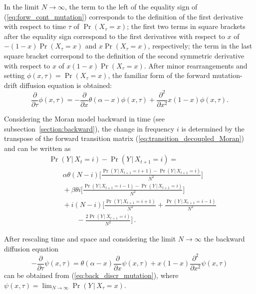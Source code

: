 \documentclass[preprint]{elsarticle}
\newcommand\given{{\,|\,}}
\newcommand\x[1]{\ensuremath{X_{#1}}}
\newcommand\y{\ensuremath{Y}}
\begin{document}
In the limit $N \to \infty$, the term to the left of the equality sign of (\ref{eq:forw_cont_mutation}) corresponds to the definition of the first derivative with respect to time $\tau$ of $\Pr(\x{\tau}=x)$; the first two terms in square brackets after the equality sign correspond to the first derivatives with respect to $x$ of $-(1-x)\Pr(\x{\tau}=x)$ and $x\Pr(\x{\tau}=x)$, respectively; the term in the last square bracket correspond to the definition of the second symmetric derivative with respect to $x$ of $x(1-x)\Pr(\x{\tau}=x)$.  After minor rearrangements and setting $\phi(x,\tau)=\Pr(\x{\tau}=x)$, the familiar form of the forward mutation-drift diffusion equation is obtained:
\begin{equation}\label{eq:forw_mutdrift}
\frac{\partial}{\partial \tau} \phi(x,\tau) = -\frac{\partial}{\partial x}\theta(\alpha-x)\phi(x,\tau) +\frac{\partial^2}{\partial x^2}x(1-x)\phi(x,\tau).
\end{equation}

Considering the Moran model backward in time (see subsection~\ref{section:backward}), the change in frequency $i$ is determined by the transpose of the forward transition matrix (\ref{eq:transition_decoupled_Moran}) and can be written as
\begin{equation}\label{eq:back_discr_mutation}
\begin{split}
&\Pr(\y\given\x{t}=i)-\Pr(\y\given\x{t+1}=i) = \\
&\qquad \alpha \theta (N-i) \bigg[\frac{\Pr(\y\given\x{t+1}=i+1)-\Pr(\y\given\x{t+1}=i)}{N^2}\bigg]\\
&\qquad+\beta \theta i \bigg[\frac{\Pr(\y\given\x{t+1}=i-1)-\Pr(\y\given\x{t+1}=i)}{N^2}\bigg]\\
&\qquad+i(N-i) \bigg[\frac{\Pr(\y\given\x{t+1}=i+1)}{N^2}+\frac{\Pr(\y\given\x{t+1}=i-1)}{N^2}\\
&\qquad\qquad-\frac{2\Pr(\y\given\x{t+1}=i)}{N^2}\bigg]\,.
\end{split}
\end{equation}

After rescaling time and space and considering the limit $N \to \infty$ the backward diffusion equation
\begin{equation}\label{eq:backw_mutdrift}
-\frac{\partial}{\partial \tau} \psi(x,\tau) =
    \theta(\alpha-x)\frac{\partial}{\partial x} \psi(x,\tau) +x(1-x)\frac{\partial^2}{\partial x^2}\psi(x,\tau)
\end{equation}
can be obtained from (\ref{eq:back_discr_mutation}), where $\psi(x,\tau)=\lim_{N\to\infty}\Pr(\y\given\x{\tau}=x)$.
\end{document}
